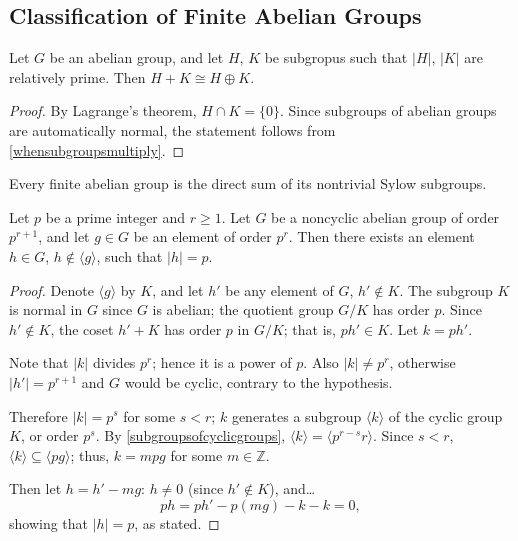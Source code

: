 \subsection{Classification of Finite Abelian Groups}\label{classificationoffiniteabeliangroups}

\begin{lemma}
Let $G$ be an abelian group, and let $H$, $K$ be subgropus such that $|H|$, $|K|$ are relatively prime. Then $H + K \cong H \oplus K$. 
\end{lemma}

\begin{proof}
By Lagrange's theorem, $H \cap K = \{ 0 \}$. Since subgroups of abelian groups are automatically normal, the statement follows from \ref{whensubgroupsmultiply}.
\end{proof}

\begin{corollary}
\label{abeliansylowgroups}
Every finite abelian group is the direct sum of its nontrivial Sylow subgroups.
\end{corollary}

\begin{lemma}
\label{elementoforderpinabeliangroup}
Let $p$ be a prime integer and $r \geq 1$. Let $G$ be a noncyclic abelian group of order $p^{r+1}$, and let $g \in G$ be an element of order $p^r$. Then there exists an element $h \in G$,
$h \not \in \langle g \rangle$, such that $|h| = p$.
\end{lemma}

\begin{proof}
Denote $\langle g \rangle$ by $K$, and let $h'$ be any element of $G$, $h' \not \in K$. The subgroup $K$ is normal in $G$ since $G$ is abelian; the quotient group $G/K$ has order $p$.
Since $h' \not \in K$, the coset $h' + K$ has order $p$ in $G/K$; that is, $ph' \in K$. Let $k = ph'.$

Note that $|k|$ divides $p^r$; hence it is a power of $p$. Also $|k| \neq p^r$, otherwise $|h'| = p^{r+1}$ and $G$ would be cyclic, contrary to the hypothesis.

Therefore $|k| = p^s$ for some $s < r$; $k$ generates a subgroup $\langle k \rangle$ of the cyclic group $K$, or order $p^s$. By \ref{subgroupsofcyclicgroups}, $\langle k \rangle = \langle p^{r-s}r \rangle$.
Since $s < r$, $\langle k \rangle \subseteq \langle pg \rangle$; thus, $k = mpg$ for some $m \in \mathbb{Z}$.

Then let $h = h' - mg$: $h \neq 0$ (since $h' \not \in K$), and\dots
$$ph = ph' - p(mg) - k -k =0,$$
showing that $|h| = p$, as stated.
\end{proof}


